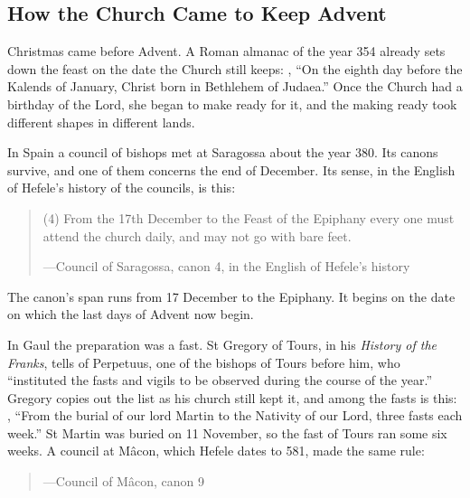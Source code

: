 \subsection{How the Church Came to Keep Advent}\label{sec:history}

Christmas came before Advent. A Roman almanac of the year 354 already sets down the feast on the date the
Church still keeps: ,
``On the eighth day before the Kalends of January, Christ born in Bethlehem of
Judaea.'' Once the Church had a birthday of the Lord, she began to make ready for
it, and the making ready took different shapes in different lands.

In Spain a council of bishops met at Saragossa about the year 380. Its canons
survive, and one of them concerns the end of December. Its sense, in the
English of Hefele's history of the councils, is this:

\begin{quote}
(4) From the 17th December to the Feast of the Epiphany every one must attend
the church daily, and may not go with bare feet.\par
{\smallskip\noindent\small ---Council of Saragossa, canon 4, in the English of Hefele's history\par}
\end{quote}

\noindent The canon's span runs from 17 December to the Epiphany. It begins on
the date on which the last days of Advent now begin.

In Gaul the preparation was a fast. St Gregory of Tours, in his \emph{History of the
Franks}, tells of Perpetuus, one of the bishops of Tours before him, who
``instituted the fasts and vigils to be observed during the course of the
year.'' Gregory copies out the list as his church still kept it, and among the
fasts is this: , ``From the burial of our
lord Martin to the Nativity of our Lord, three fasts each week.'' St Martin was
buried on 11 November, so the fast of Tours ran some six weeks. A council at
Mâcon, which Hefele dates to 581, made the same rule:

\begin{quote}
\par
{\smallskip\noindent\small ---Council of Mâcon, canon 9\par}
\end{quote}

